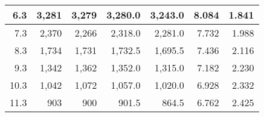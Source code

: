 \begin{table}[H]
\begin{tabular}{|r|r|r|r|r|r|r|}
		6.3                                                    & 3,281                                                & 3,279                                                & 3,280.0                                                 & 3,243.0                                              & 8.084                                             & 1.841                                             \\ \hline
		7.3                                                    & 2,370                                                & 2,266                                                & 2,318.0                                                 & 2,281.0                                              & 7.732                                             & 1.988                                             \\ \hline
		8.3                                                    & 1,734                                                & 1,731                                                & 1,732.5                                                 & 1,695.5                                              & 7.436                                             & 2.116                                             \\ \hline
		9.3                                                    & 1,342                                                & 1,362                                                & 1,352.0                                                 & 1,315.0                                              & 7.182                                             & 2.230                                             \\ \hline
		10.3                                                   & 1,042                                                & 1,072                                                & 1,057.0                                                 & 1,020.0                                              & 6.928                                             & 2.332                                             \\ \hline
		11.3                                                   & 903                                                  & 900                                                  & 901.5                                                   & 864.5                                                & 6.762                                             & 2.425                                             \\ \hline

\end{tabular}
\end{table}
